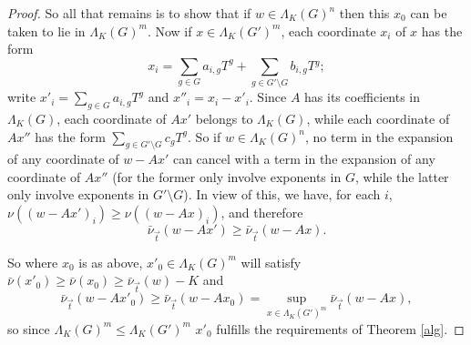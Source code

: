 \documentclass{amsart}
\theoremstyle{plain}
\theoremstyle{definition}
\theoremstyle{remark}
\def\barnu{\bar{\nu}}
\begin{document}
\begin{proof}
So all that remains is to show that if $w\in \Lambda_K(G)^n$ then this $x_0$ can be taken to lie in $\Lambda_K(G)^m$.  Now if $x\in \Lambda_K(G')^m$, each coordinate $x_i$ of $x$ has the form \[ x_i=\sum_{g\in G}a_{i,g}T^{g}+\sum_{g\in G'\setminus G}b_{i,g}T{^g};\] write $x'_i=\sum_{g\in G}a_{i,g}T^{g}$ and $x''_i=x_i-x'_i$.  Since $A$ has its coefficients in $\Lambda_K(G)$, each coordinate of  $Ax'$ belongs to $\Lambda_K(G)$, while each coordinate of $Ax''$ has the form $\sum_{g\in G'\setminus G}c_gT^g$.   So if $w\in \Lambda_K(G)^n$, no term in the expansion of any coordinate of $w-Ax'$ can cancel with a term in the expansion of any coordinate of $Ax''$ (for the former only involve exponents in $G$, while the latter only involve exponents in $G'\setminus G$).  In view of this, we have, for each $i$, $\nu((w-Ax')_i)\geq \nu((w-Ax)_i)$, and therefore \[ \barnu_{\vec{t}}(w-Ax')\geq \barnu_{\vec{t}}(w-Ax).\]

So where $x_0$ is as above, $x'_0\in \Lambda_K(G)^m$ will satisfy $\barnu(x'_0)\geq \barnu(x_0)\geq \barnu_{\vec{t}}(w)-K$ and 
\[ \barnu_{\vec{t}}(w-Ax'_0)\geq \barnu_{\vec{t}}(w-Ax_0)=\sup_{x\in \Lambda_K(G')^m}\barnu_{\vec{t}}(w-Ax),\] so since $\Lambda_K(G)^m\leq \Lambda_K(G')^m$ $x'_0$ fulfills the requirements of Theorem \ref{alg}.
\end{proof}
 
\end{document}
